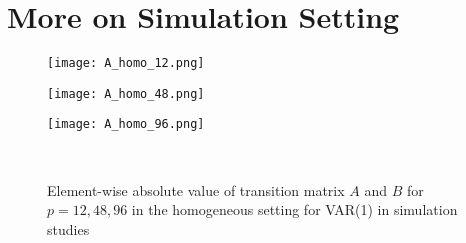 \section{More on Simulation Setting}
\label{sec:simulation_setting}

\begin{figure}[H] 
\centering 
    \begin{minipage}{.2\textwidth}
    \texttt{[image: A\_homo\_12.png]}
    \end{minipage}
    \begin{minipage}{.2\textwidth}
    \texttt{[image: A\_homo\_48.png]}
    \end{minipage} 
     \begin{minipage}{.2\textwidth}
    \texttt{[image: A\_homo\_96.png]}
    \end{minipage} \\
\caption{Element-wise absolute value of transition matrix $A$ and $B$ for $p = 12, 48, 96$ in the homogeneous setting for VAR(1) in simulation studies}
\label{fig::Ahomo}
\end{figure}


\newpage
